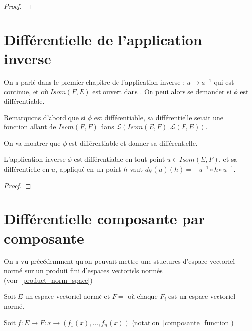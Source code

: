 \begin{proof}
	
\end{proof}

\section{Différentielle de l'application inverse}

On a parlé dans le premier chapitre de l'application inverse
: $u \rightarrow
u^{-1}$ qui est continue, et où $Isom(F, E)$ est ouvert dans
.
On peut alors se demander si $\phi$ est différentiable.

Remarquons d'abord que si $\phi$ est différentiable, sa différentielle serait
une fonction allant de $Isom(E, F)$ dans $\mathcal{L}(Isom(E, F), \mathcal{L}(F,
E))$.

On va montrer que $\phi$ est différentiable et donner sa différentielle.

\begin{theorem}
\label{differential_inverse_application}
	L'application inverse $\phi$ est différentiable en tout point $u \in Isom(E,
	F)$, et sa différentielle en $u$, appliqué en un point $h$ vaut $d\phi(u)(h)
	= -u^{-1} \circ h \circ u^{-1}$.
\end{theorem}

\begin{proof}
	
\end{proof}

\section{Différentielle composante par composante}
\label{section_differential_composante}


On a vu précédemment qu'on pouvait mettre une stuctures d'espace vectoriel
normé sur un produit fini d'espaces vectoriels normés (voir~\ref{product_norm_space})

Soit $E$ un espace vectoriel normé et $F = $  où chaque 
$F_{i}$ est un espace vectoriel normé.

Soit $f : E \rightarrow F : x \rightarrow (f_{1}(x), \ldots, f_{n}(x))$
(notation~\ref{composante_function})

